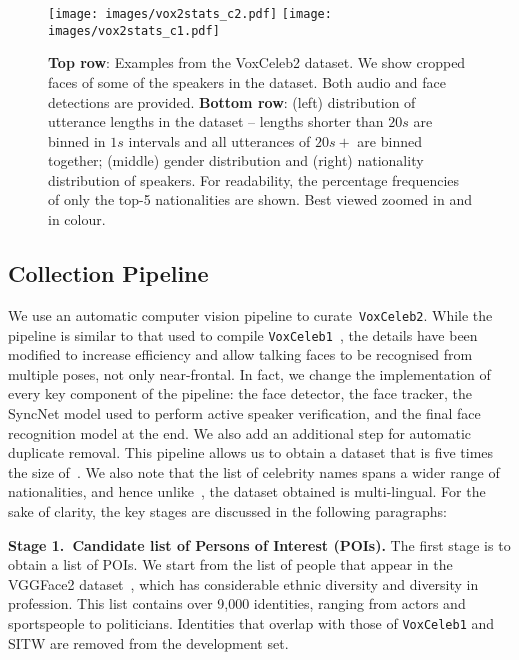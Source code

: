 \documentclass[a4paper]{article}
\def\newpara{\vspace{2pt}}
\def\subsec{\vspace{-5pt}}
\begin{document}
\begin{figure*}[ht]
\vspace{-30pt}
\centering
\texttt{[image: images/vox2stats\_c2.pdf]}
\texttt{[image: images/vox2stats\_c1.pdf]}
   \caption{{\bf Top row}: Examples from the VoxCeleb2 dataset. We show cropped faces of some of the speakers in the dataset. Both audio and face detections are provided. {\bf Bottom row}: (left) distribution of utterance lengths in the dataset -- lengths shorter than $20s$ are binned in $1s$ intervals and all utterances of $20s+$ are binned together; (middle) gender distribution and (right) nationality distribution of speakers. For readability, the percentage frequencies of only the top-5 nationalities are shown. Best viewed zoomed in and in colour. }
\label{fig:vox2stats}
\vspace{-14pt}
\end{figure*}



\subsection{Collection Pipeline}
\subsec

We use an automatic computer vision pipeline to
curate~\texttt{VoxCeleb2}. While the pipeline is similar to that used
to compile \texttt{VoxCeleb1}~\cite{Nagrani17}, the details have been
modified to increase efficiency and allow talking faces to be
recognised from multiple poses, not only near-frontal. In fact, we change the
implementation of every key component of the pipeline: the face
detector, the face tracker, the SyncNet model used to perform active
speaker verification, and the final face recognition model at the
end. We also add an additional step for automatic duplicate
removal. This pipeline allows us to obtain a dataset that is five times the size
of~\cite{Nagrani17}. We also note that the list of celebrity names
spans a wider range of nationalities, and hence 
unlike~\cite{Nagrani17}, the dataset obtained is multi-lingual.  For the
sake of clarity, the key stages are discussed in the following
paragraphs: 



\newpara\noindent\textbf{Stage 1.\  Candidate list of Persons of Interest (POIs).}
The first stage is to obtain a list of POIs. We start from the list of people that appear in the VGGFace2 dataset~\cite{cao2017vggface2}, which has considerable ethnic diversity and diversity in profession. This list contains over 9,000 identities, ranging from actors and sportspeople to politicians. 
Identities that overlap with those of \texttt{VoxCeleb1} and SITW are removed from the development set. 
\end{document}
